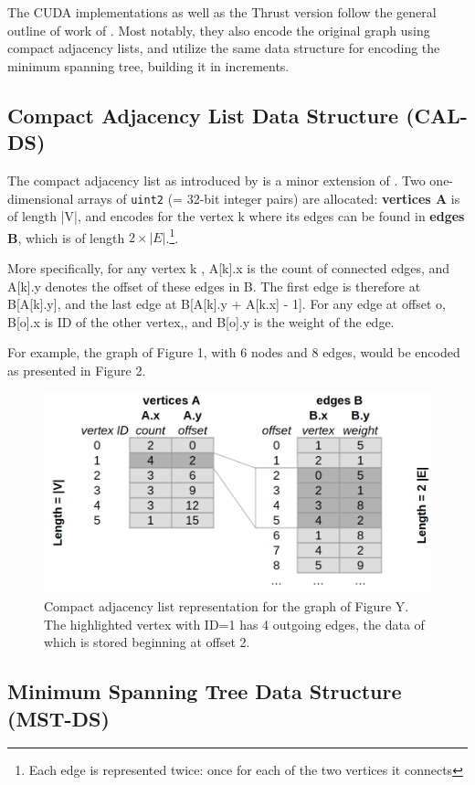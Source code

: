 \documentclass[sigconf,nonacm]{acmart}
\begin{document}
The CUDA implementations as well as the Thrust version follow the general outline of work of \cite{wang2011design}. Most notably, they also encode the original graph using compact adjacency lists, and utilize the same data structure for encoding the minimum spanning tree, building it in increments.

\subsection{Compact Adjacency List Data Structure (CAL-DS)}

The compact adjacency list as introduced by \cite{wang2011design} is a minor extension of \cite{Harish07}.
Two one-dimensional arrays of \texttt{uint2} (= 32-bit integer pairs) are allocated:
\textbf{vertices A} is of length |V|, and encodes for the vertex k where its edges can be found
in \textbf{edges B}, which is of length $2\times|E|$.\footnote{Each edge is represented twice: once for each of the two vertices it connects}.

More specifically, for any vertex k , A[k].x is the count of connected edges, and A[k].y denotes the offset of these edges in B. The first edge is therefore at B[A[k].y], and the last edge at B[A[k].y + A[k.x] - 1]. For any edge at offset o, B[o].x is ID of the other vertex,, and B[o].y is the weight of the edge.

For example, the graph of Figure 1, with 6 nodes and 8 edges, would be encoded as presented in Figure 2.

\begin{figure}
\centering
\includegraphics[width=0.7\linewidth]{compact-adjacency-list.png}
\caption{Compact adjacency list representation for the graph of Figure Y. The highlighted vertex with ID=1 has 4 outgoing edges, the data of which is stored beginning at offset 2.}
\label{fig:compact-adjacency-list}
\end{figure}

\subsection{Minimum Spanning Tree Data Structure (MST-DS)}
\end{document}
